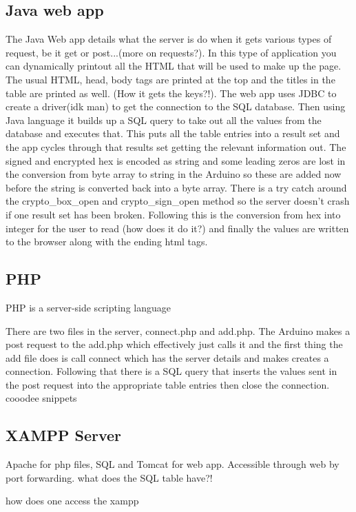 \subsection{Java web app}

The Java Web app details what the server is do when it gets various types of request, be it get or post...(more on requests?). In this type of application you can dynamically printout all the HTML that will be used to make up the page. The usual  HTML, head, body tags are printed at the top and the titles in the table are printed as well. (How it gets the keys?!). The web app uses JDBC to create a driver(idk man) to get the connection to the SQL database. Then using Java language it builds up a SQL query to take out all the values from the database and executes that. This puts all the table entries into a result set and the app cycles through that results set getting the relevant information out. The signed and encrypted hex is encoded as string and some leading zeros are lost in the conversion from byte array to string in the Arduino so these are added now before the string is converted back into a byte array. There is a try catch around the crypto\_box\_open and crypto\_sign\_open method so the server doesn't crash if one result set has been broken. Following this is the conversion from hex into integer for the user to read (how does it do it?) and finally the values are written to the browser along with the ending html tags.

\subsection{PHP}
PHP is a server-side scripting language 

There are two files in the server, connect.php and add.php. The Arduino makes a post request to the add.php which effectively just calls it and the first thing the add file does is call connect which has the server details and makes creates a connection. Following that there is a SQL query that inserts the values sent in the post request into the appropriate table entries then close the connection. cooodee snippets

\subsection{XAMPP Server}
Apache for php files, SQL and Tomcat for web app. Accessible through web by port forwarding.
what does the SQL table have?!

how does one access the xampp


